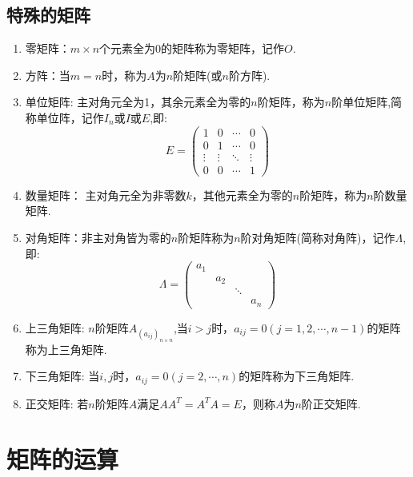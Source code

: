 \documentclass[lang=cn,10pt]{elegantbook}
\begin{document}
\subsection{特殊的矩阵}
\begin{enumerate}
    \item 零矩阵：$m\times n$个元素全为0的矩阵称为零矩阵，记作$\textit{O}$.
    \item 方阵：当$m=n$时，称为$A$为$n$阶矩阵(或$n$阶方阵).
    \item 单位矩阵: 主对角元全为1，其余元素全为零的$n$阶矩阵，称为$n$阶单位矩阵,简称单位阵，记作$I_n$或$I$或$E$,即:\begin{equation}
        E  = \begin{pmatrix}
            1&0&\cdots&0\\
            0&1&\cdots&0\\
            \vdots&\vdots&\ddots&\vdots\\
            0&0&\cdots&1
        \end{pmatrix}
    \end{equation}
    \item 数量矩阵： 主对角元全为非零数$k$，其他元素全为零的$n$阶矩阵，称为$n$阶数量矩阵.
    \item 对角矩阵：非主对角皆为零的$n$阶矩阵称为$n$阶对角矩阵(简称对角阵)，记作$\Lambda$,即:
    \begin{equation}
        \Lambda = \begin{pmatrix}
            a_1&&&\\
            &a_2&&\\
            &&\ddots\\
            &&& a_n
        \end{pmatrix}
    \end{equation}
    \item 上三角矩阵: $n$阶矩阵$A_(a_{ij})_{n\times n}$,当$i>j$时，$a_{ij}=0(j=1,2,\cdots,n-1)$的矩阵称为上三角矩阵.
    \item 下三角矩阵: 当$i,j$时，$a_{ij}=0(j=2,\cdots,n)$的矩阵称为下三角矩阵.
    \item 正交矩阵: 若$n$阶矩阵$A$满足$AA^{T}=A^{T}A=E$，则称$\textit{A}$为$n$阶正交矩阵.
\end{enumerate}


\section{矩阵的运算}
\end{document}
